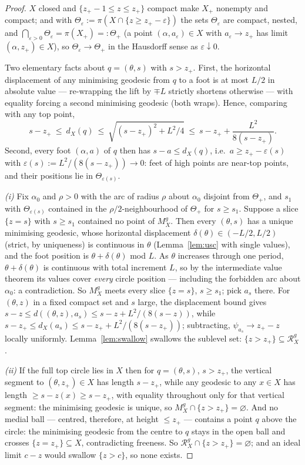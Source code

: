 \documentclass[11pt]{article}
\theoremstyle{remark}
\newcommand{\X}{X}
\newcommand{\Mg}{M^{g}_{\X}}
\newcommand{\Rg}{\mathcal{R}^{g}_{\X}}
\newcommand{\dX}{d_{\X}}
\begin{document}
\begin{proof}
$\X$ closed and $\{z_{+}-1\le z\le z_{+}\}$ compact make $\X_{+}$
nonempty and compact; and with
$\Theta_{\varepsilon}:=\pi(\X\cap\{z\ge z_{+}-\varepsilon\})$ the
sets $\Theta_{\varepsilon}$ are compact, nested, and
$\bigcap_{\varepsilon>0}\Theta_{\varepsilon}=\pi(\X_{+})=:
\Theta_{+}$ (a point $(\alpha,a_{\varepsilon})\in\X$ with
$a_{\varepsilon}\to z_{+}$ has limit $(\alpha,z_{+})\in\X$), so
$\Theta_{\varepsilon}\to\Theta_{+}$ in the Hausdorff sense as
$\varepsilon\downarrow0$.

Two elementary facts about $q=(\theta,s)$ with $s>z_{+}$. First, the
horizontal displacement of any minimising geodesic from $q$ to a
foot is at most $L/2$ in absolute value --- re-wrapping the lift by
$\mp L$ strictly shortens otherwise --- with equality forcing a
second minimising geodesic (both wraps). Hence, comparing with any
top point,
\[
  s-z_{+}\ \le\ \dX(q)\ \le\ \sqrt{(s-z_{+})^{2}+L^{2}/4}
  \ \le\ s-z_{+}+\frac{L^{2}}{8(s-z_{+})}.
\]
Second, every foot $(\alpha,a)$ of $q$ then has
$s-a\le\dX(q)$, i.e.\ $a\ge z_{+}-\varepsilon(s)$ with
$\varepsilon(s):=L^{2}/(8(s-z_{+}))\to0$: feet of high points are
near-top points, and their positions lie in
$\Theta_{\varepsilon(s)}$.

\emph{(i)} Fix $\alpha_{0}$ and $\rho>0$ with the arc of radius
$\rho$ about $\alpha_{0}$ disjoint from $\Theta_{+}$, and $s_{1}$
with $\Theta_{\varepsilon(s)}$ contained in the
$\rho/2$-neighbourhood of $\Theta_{+}$ for $s\ge s_{1}$. Suppose a
slice $\{z=s\}$ with $s\ge s_{1}$ contained no point of $\Mg$. Then
every $(\theta,s)$ has a unique minimising geodesic, whose
horizontal displacement $\delta(\theta)\in(-L/2,L/2)$ (strict, by
uniqueness) is continuous in $\theta$ (Lemma~\ref{lem:usc} with
single values), and the foot position is $\theta+\delta(\theta)$
mod $L$. As $\theta$ increases through one period,
$\theta+\delta(\theta)$ is continuous with total increment $L$, so
by the intermediate value theorem its values cover \emph{every}
circle position --- including the forbidden arc about $\alpha_{0}$:
a contradiction. So $\Mg$ meets every slice $\{z=s\}$, $s\ge s_{1}$;
pick $a_{s}$ there. For $(\theta,z)$ in a fixed compact set and $s$
large, the displacement bound gives
$s-z\le d((\theta,z),a_{s})\le s-z+L^{2}/(8(s-z))$, while
$s-z_{+}\le\dX(a_{s})\le s-z_{+}+L^{2}/(8(s-z_{+}))$; subtracting,
$\psi_{a_{s}}\to z_{+}-z$ locally uniformly. Lemma~\ref{lem:swallow}
swallows the sublevel set: $\{z>z_{+}\}\subseteq\Rg$.

\emph{(ii)} If the full top circle lies in $\X$ then for
$q=(\theta,s)$, $s>z_{+}$, the vertical segment to
$(\theta,z_{+})\in\X$ has length $s-z_{+}$, while any geodesic to
any $x\in\X$ has length $\ge s-z(x)\ge s-z_{+}$, with equality
throughout only for that vertical segment: the minimising geodesic
is unique, so $\Mg\cap\{z>z_{+}\}=\varnothing$. And no medial ball
--- centred, therefore, at height $\le z_{+}$ --- contains a point
$q$ above the circle: the minimising geodesic from the centre to $q$
stays in the open ball and crosses
$\{z=z_{+}\}\subseteq\X$, contradicting freeness. So
$\Rg\cap\{z>z_{+}\}=\varnothing$; and an ideal limit $c-z$ would
swallow $\{z>c\}$, so none exists.
\end{proof}
\end{document}

